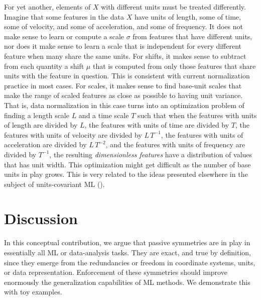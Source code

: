 \documentclass[preprint]{article} %
\begin{document}
For yet another, elements of $X$ with different units must be treated differently.
Imagine that some features in the data $X$ have units of length, some of time, some of velocity, and some of acceleration, and some of frequency.
It does not make sense to learn or compute a scale $\sigma$ from features that have different units, nor does it make sense to learn a scale that is independent for every different feature when many share the same units.
For shifts, it makes sense to subtract from each quantity a shift $\mu$ that is computed from only those features that share units with the feature in question.
This is consistent with current normalization practice in most cases.
For scales, it makes sense to find base-unit scales that make the range of scaled features as close as possible to having unit variance.
That is, data normalization in this case turns into an optimization problem of finding a length scale $L$ and a time scale $T$ such that when the features with units of length are divided by $L$, the features with units of time are divided by $T$, the features with units of velocity are divided by $L\,T^{-1}$, the features with units of acceleration are divided by $L\,T^{-2}$, and the features with units of frequency are divided by $T^{-1}$, the resulting \emph{dimensionless features} have a distribution of values that has unit width.
This optimization might get difficult as the number of base units in play grows.
This is very related to the ideas presented elsewhere in the subject of units-covariant ML (\citealt{villar2022dimensionless}).

\section{Discussion}\label{sec:discussion}
In this conceptual contribution,
we argue that passive symmetries are in play in essentially all ML or data-analysis tasks.
They are exact, and true by definition, since they emerge from the redundancies or freedom in coordinate systems, units, or data representation.
Enforcement of these symmetries should improve enormously the generalization capabilities of ML methods.
We demonstrate this with toy examples.
\end{document}
